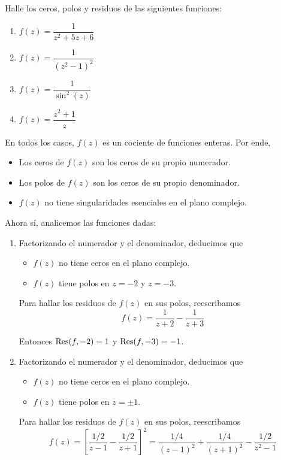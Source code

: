 \begin{exercise}
Halle los ceros, polos y residuos de las siguientes funciones:
\begin{enumerate}[label=(\alph*)]
    \item $f(z) = \dfrac 1 {z^2 + 5z + 6}$
    \item $f(z) = \dfrac 1 {(z^2 - 1)^2}$
    \item $f(z) = \dfrac 1 {\sin^2(z)}$
    \item $f(z) = \dfrac {z^2 + 1} z$
\end{enumerate}
\end{exercise}

\begin{solution}
En todos los casos, $f(z)$ es un cociente de funciones enteras. Por ende,
\begin{itemize}
    \item Los ceros de $f(z)$ son los ceros de su propio numerador.
    \item Los polos de $f(z)$ son los ceros de su propio denominador.
    \item $f(z)$ no tiene singularidades esenciales en el plano complejo.
\end{itemize}
Ahora sí, analicemos las funciones dadas:
\begin{enumerate}[label=(\alph*)]
    \item Factorizando el numerador y el denominador, deducimos que
    \begin{itemize}
        \item $f(z)$ no tiene ceros en el plano complejo.
        \item $f(z)$ tiene polos en $z = -2$ y $z = -3.$
    \end{itemize}
    
    Para hallar los residuos de $f(z)$ en sus polos, reescribamos
    $$f(z) = \frac 1 {z + 2} - \frac 1 {z + 3}$$
    
    Entonces $\operatorname{Res}(f, -2) = 1$ y $\operatorname{Res}(f, -3) = -1$.
    
    \item Factorizando el numerador y el denominador, deducimos que
    \begin{itemize}
        \item $f(z)$ no tiene ceros en el plano complejo.
        \item $f(z)$ tiene polos en $z = \pm 1$.
    \end{itemize}
    
    Para hallar los residuos de $f(z)$ en sus polos, reescribamos
    $$
    f(z)
        = \left[ \frac {1/2} {z - 1} - \frac {1/2} {z + 1} \right]^2
        = \frac {1/4} {(z - 1)^2} + \frac {1/4} {(z + 1)^2} - \frac {1/2} {z^2 - 1}
    $$
    

\end{enumerate}
\end{solution}

